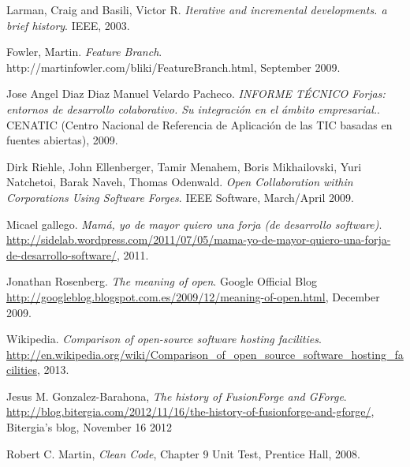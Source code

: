 \documentclass[a4paper, 12pt]{book}
\begin{document}





\begin{comment}
    Referenciar bibliografía: reference 1 ~\cite{New-commercial-OSS-standford-2010}.
\end{comment}

\begin{thebibliography}{25}


 Larman, Craig and Basili, Victor R. \textit{Iterative and incremental developments. a brief history}. IEEE, 2003.

 Fowler, Martin. \textit{Feature Branch}. http://martinfowler.com/bliki/FeatureBranch.html, September 2009.


 Jose Angel Diaz Diaz Manuel Velardo Pacheco. \textit{INFORME TÉCNICO Forjas: entornos de desarrollo colaborativo. Su integración en el ámbito empresarial.}. CENATIC (Centro Nacional de Referencia de Aplicación de las TIC basadas en fuentes abiertas), 2009.

 Dirk Riehle, John Ellenberger, Tamir Menahem, Boris Mikhailovski, Yuri Natchetoi, Barak Naveh, Thomas Odenwald. \textit{Open Collaboration within Corporations Using Software Forges}. IEEE Software, March/April 2009.

 Micael gallego. \textit{Mamá, yo de mayor quiero una forja (de desarrollo software)}. \url{http://sidelab.wordpress.com/2011/07/05/mama-yo-de-mayor-quiero-una-forja-de-desarrollo-software/}, 2011.

 Jonathan Rosenberg. \textit{The meaning of open}. Google Official Blog \url{http://googleblog.blogspot.com.es/2009/12/meaning-of-open.html}, December 2009.

 Wikipedia. \textit{Comparison of open-source software hosting facilities}. \url{http://en.wikipedia.org/wiki/Comparison_of_open_source_software_hosting_facilities}, 2013.

 Jesus M. Gonzalez-Barahona, \textit{The history of FusionForge and GForge}. \url{http://blog.bitergia.com/2012/11/16/the-history-of-fusionforge-and-gforge/}, Bitergia's blog, November 16 2012

 Robert C. Martin, \textit{Clean Code}, Chapter 9 Unit Test, Prentice Hall, 2008.

\end{thebibliography}
\end{document}
